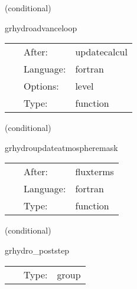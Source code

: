 \documentclass{article}
\begin{document}
\vspace{5mm}

   (conditional) 

\hspace{5mm} grhydroadvanceloop 

\hspace{5mm}{\it decrement the flux\_direction variable } 


\hspace{5mm}

 \begin{tabular*}{160mm}{cll} 
~ & After:  & updatecalcul \\ 
~ & Language:  & fortran \\ 
~ & Options:  & level \\ 
~ & Type:  & function \\ 
\end{tabular*} 


\vspace{5mm}

   (conditional) 

\hspace{5mm} grhydroupdateatmospheremask 

\hspace{5mm}{\it alter the update terms if inside the atmosphere region } 


\hspace{5mm}

 \begin{tabular*}{160mm}{cll} 
~ & After:  & fluxterms \\ 
~ & Language:  & fortran \\ 
~ & Type:  & function \\ 
\end{tabular*} 


\vspace{5mm}

   (conditional) 

\hspace{5mm} grhydro\_poststep 

\hspace{5mm}{\it post step tasks for grhydro } 


\hspace{5mm}

 \begin{tabular*}{160mm}{cll} 
~ & Type:  & group \\ 
\end{tabular*} 
\end{document}
